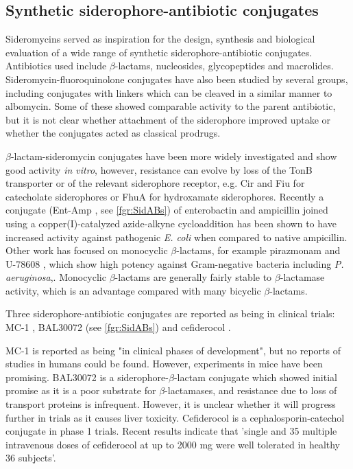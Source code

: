 \subsection{Synthetic siderophore-antibiotic conjugates\label{sec:sidABs}}

Sideromycins served as inspiration for the design, synthesis and biological evaluation of a wide range of synthetic siderophore-antibiotic conjugates\cite{Page2013}. Antibiotics used include $\beta$-lactams\cite{Mollmann2009,Dini2000,Kline2000}, nucleosides\cite{Lu1999}, glycopeptides\cite{Ghosh1996} and macrolides\cite{Ghosh1995}. Sideromycin-fluoroquinolone conjugates have also been studied by several groups\cite{Md-Saleh2009,Rivault2007,Ji2012}, including conjugates with linkers which can be cleaved\cite{Rivault2007,Ji2012} in a similar manner to albomycin\cite{Hartmann1979}. Some of these showed comparable activity to the parent antibiotic, but it is not clear whether attachment of the siderophore improved uptake or whether the conjugates acted as classical prodrugs.

$\beta$-lactam-sideromycin conjugates have been more widely investigated and show good activity \textit{in vitro}, however, resistance can evolve by loss of the TonB transporter or of the relevant siderophore receptor, e.g. Cir and Fiu for catecholate siderophores or FhuA for hydroxamate siderophores\cite{Page2013}. 
Recently a conjugate (Ent-Amp , see \ref{fgr:SidABs}) of enterobactin and ampicillin joined using a copper(I)-catalyzed azide-alkyne cycloaddition has been shown to have increased activity against pathogenic \textit{E. coli} when compared to native ampicillin\cite{Zheng2014}. 
Other work has focused on monocyclic $\beta$-lactams, for example pirazmonam  and U-78608 , which show high potency against Gram-negative bacteria including \textit{P. aeruginosa},\cite{Zurenko1990,Harrington2012}. Monocyclic $\beta$-lactams are generally fairly stable to $\beta$-lactamase activity, which is an advantage compared with many bicyclic $\beta$-lactams.

Three siderophore-antibiotic conjugates are reported as being in clinical trials\cite{Schalk2017}: MC-1 \cite{McPherson2012}, BAL30072 \cite{Page2013} (see \ref{fgr:SidABs}) and cefiderocol \cite{Ito2018,Saisho2018}.

MC-1  is reported as being "in clinical phases of development"\cite{Schalk2017}, but no reports of studies in humans could be found. However, experiments in mice have been promising\cite{McPherson2012}.
BAL30072  is a siderophore-$\beta$-lactam conjugate which showed initial promise as it is a poor substrate for $\beta$-lactamases, and resistance due to loss of transport proteins is infrequent\cite{Page2013}. However, it is unclear whether it will progress further in trials as it causes liver toxicity\cite{Paech2017}. 
Cefiderocol  is a cephalosporin-catechol conjugate in phase 1 trials. Recent results indicate that 'single and 35 multiple intravenous doses of cefiderocol at up to 2000 mg were well tolerated in healthy 36 subjects'\cite{Saisho2018}.

